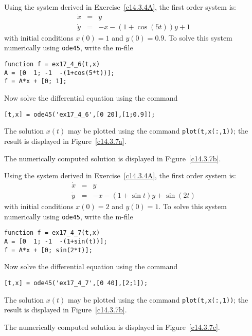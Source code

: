\documentclass{ximera}
\begin{document}
\soln  Using the system  derived in 
Exercise~\ref{c14.3.4A}, the first order system is:
\begin{eqnarray*}
\dot{x} & = & y \\
\dot{y} & = & -x - (1+\cos(5t))y + 1
\end{eqnarray*}
with initial conditions $x(0)=1$ and $y(0)=0.9$.   To solve this system numerically 
using {\tt ode45}, write the m-file
\begin{verbatim}
function f = ex17_4_6(t,x)
A = [0  1; -1  -(1+cos(5*t))];
f = A*x + [0; 1];
\end{verbatim}
Now solve the differential equation using the command
\begin{verbatim}
[t,x] = ode45('ex17_4_6',[0 20],[1;0.9]);
\end{verbatim}
The solution $x(t)$ may be plotted using the command {\tt plot(t,x(:,1))}; the 
result is displayed in Figure~\ref{c14.3.7a}.
\begin{figure}[htb]
     \centerline{%
     }
\end{figure} 


  \ans The numerically computed solution is displayed in 
Figure~\ref{c14.3.7b}.

\soln  Using the system  derived in 
Exercise~\ref{c14.3.4A}, the first order system is:
\begin{eqnarray*}
\dot{x} & = & y \\
\dot{y} & = & -x - (1+\sin t)y + \sin(2t)
\end{eqnarray*}
with initial conditions $x(0)=2$ and $y(0)=1$.  To solve this system numerically 
using {\tt ode45}, write the m-file
\begin{verbatim}
function f = ex17_4_7(t,x)
A = [0  1; -1  -(1+sin(t))];
f = A*x + [0; sin(2*t)];
\end{verbatim}
Now solve the differential equation using the command
\begin{verbatim}
[t,x] = ode45('ex17_4_7',[0 40],[2;1]);
\end{verbatim}
The solution $x(t)$ may be plotted using the command {\tt plot(t,x(:,1))}; the 
result is displayed in Figure~\ref{c14.3.7b}.
\begin{figure}[htb]
     \centerline{%
     }
\end{figure} 


  \ans The numerically computed solution is displayed in 
Figure~\ref{c14.3.7c}.
\end{document}
